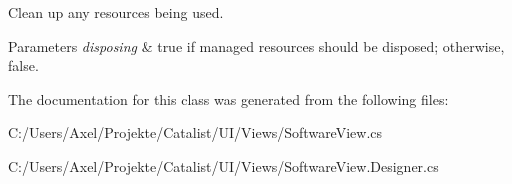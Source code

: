 Clean up any resources being used. 


\begin{DoxyParams}{Parameters}
{\em disposing} & true if managed resources should be disposed; otherwise, false.\\
\hline
\end{DoxyParams}


The documentation for this class was generated from the following files\+:\begin{DoxyCompactItemize}
\item 
C\+:/\+Users/\+Axel/\+Projekte/\+Catalist/\+U\+I/\+Views/Software\+View.\+cs\item 
C\+:/\+Users/\+Axel/\+Projekte/\+Catalist/\+U\+I/\+Views/Software\+View.\+Designer.\+cs\end{DoxyCompactItemize}
